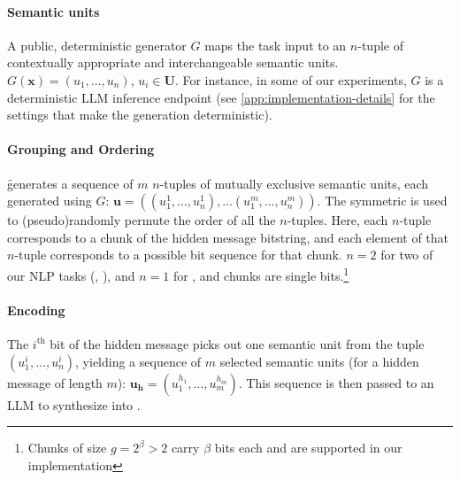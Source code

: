 \paragraph{Semantic units}
A public, deterministic generator $G$ maps the task input \inp to an $n$-tuple of contextually appropriate and interchangeable semantic units.
$G(\mathbf{x}) = (u_1,\ldots,u_n)$, $u_i \in \mathbf{U}$.
For instance, in some of our experiments, $G$ is a deterministic LLM inference endpoint (see \autoref{app:implementation-details} for the settings that make the generation deterministic).

\paragraph{Grouping and Ordering} \f generates a sequence of $m$ $n$-tuples of mutually exclusive semantic units, each generated using $G$: $\mathbf{u} = ((u_1^{1}, \ldots, u_n^{1}),\ldots(u_1^{m}, \ldots, u_n^{m}))$. The symmetric \key is used to (pseudo)randomly permute the order of all the $n$-tuples. Here, each $n$-tuple corresponds to a chunk of the hidden message bitstring, and each element of that $n$-tuple corresponds to a possible bit sequence for that chunk. $n = 2$ for two of our NLP tasks (\qa, \sg), and $n = 1$ for \lr, and chunks are single bits.\footnote{Chunks of size $g = 2^\beta > 2$ carry $\beta$ bits each and are supported in our implementation}



\paragraph{Encoding}
The $i^\text{th}$ bit of the hidden message picks out one semantic unit from the tuple $(u_1^i, \ldots, u_n^i)$, yielding a sequence of $m$ selected semantic units (for a hidden message of length $m$): $\mathbf{u_h} = (u_1^{h_1}, \ldots, u_m^{h_m})$. This sequence is then passed to an LLM to synthesize into \stegotext.

